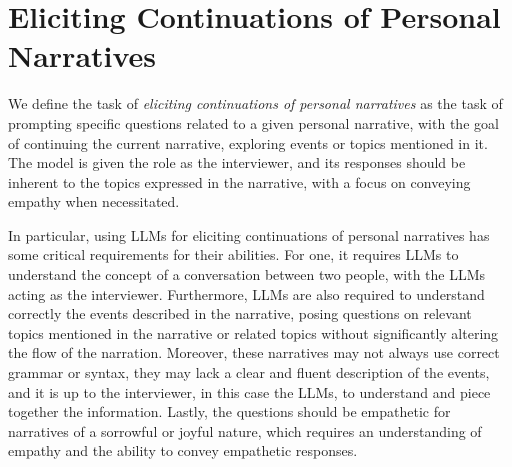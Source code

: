 \section{Eliciting Continuations of Personal Narratives}
We define the task of \emph{eliciting continuations of personal narratives} as the task of prompting specific questions related to a given personal narrative, with the goal of continuing the current narrative, exploring events or topics mentioned in it. The model is given the role as the interviewer, and its responses should be inherent to the topics expressed in the narrative, with a focus on conveying empathy when necessitated.

In particular, using LLMs for eliciting continuations of personal narratives has some critical requirements for their abilities. For one, it requires LLMs to understand the concept of a conversation between two people, with the LLMs acting as the interviewer. Furthermore, LLMs are also required to understand correctly the events described in the narrative, posing questions on relevant topics mentioned in the narrative or related topics without significantly altering the flow of the narration. Moreover, these narratives may not always use correct grammar or syntax, they may lack a clear and fluent description of the events, and it is up to the interviewer, in this case the LLMs, to understand and piece together the information. Lastly, the questions should be empathetic for narratives of a sorrowful or joyful nature, which requires an understanding of empathy and the ability to convey empathetic responses.


